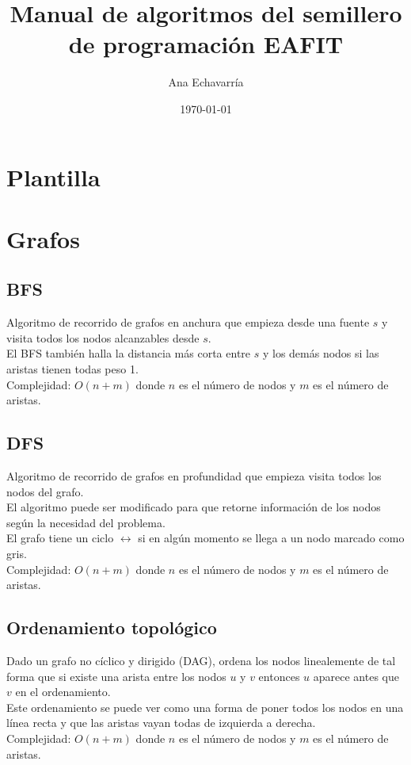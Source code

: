 \documentclass[10pt,letterpaper,twocolumn]{article}
\newcommand{\source}[1]{
	
	\dotfill
}
\begin{document}
\title{Manual de algoritmos del semillero de programación EAFIT}
\author{Ana Echavarría}
\date{\today}
\maketitle

\tableofcontents

\section{Plantilla}
	\source{./src/template.cpp}

\section{Grafos}

	\subsection{BFS}
		Algoritmo de recorrido de grafos en anchura que empieza desde una fuente $s$ y visita todos los nodos alcanzables desde $s$.\\
		El BFS también halla la distancia más corta entre $s$ y los demás nodos si las aristas tienen todas peso 1.\\
		Complejidad: $O(n+m)$ donde $n$ es el número de nodos y $m$ es el número de aristas.\\
		\source{./src/bfs.cpp}
		
	\subsection{DFS}
		Algoritmo de recorrido de grafos en profundidad que empieza visita todos los nodos del grafo.\\
		El algoritmo puede ser modificado para que retorne información de los nodos según la necesidad del problema.\\
		El grafo tiene un ciclo $\leftrightarrow$ si en algún momento se llega a un nodo marcado como gris.\\
		Complejidad: $O(n+m)$ donde $n$ es el número de nodos y $m$ es el número de aristas.\\
		\source{./src/dfs.cpp}
		
	\subsection{Ordenamiento topológico}
		Dado un grafo no cíclico y dirigido (DAG), ordena los nodos linealemente de tal forma que si existe una arista entre los nodos $u$ y $v$ entonces $u$ aparece antes que $v$ en el ordenamiento.\\
		Este ordenamiento se puede ver como una forma de poner todos los nodos en una línea recta y que las aristas vayan todas de izquierda a derecha.\\
		Complejidad: $O(n+m)$ donde $n$ es el número de nodos y $m$ es el número de aristas.\\
		\source{./src/ordenamiento_topologico.cpp}
		
\end{document}
